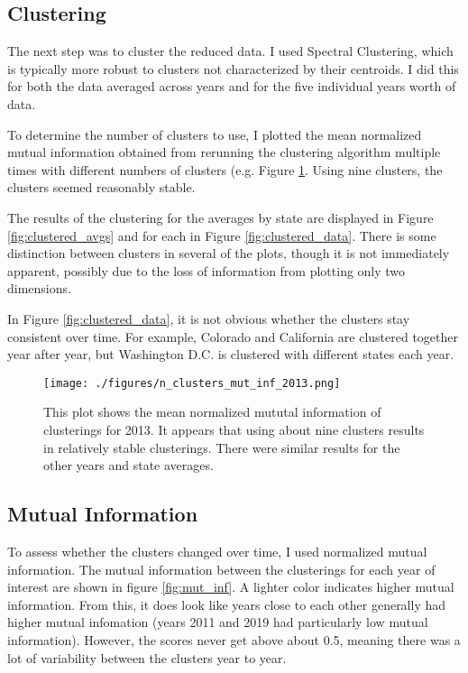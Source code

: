 \documentclass[11pt]{article}
\begin{document}
\subsection{Clustering}
The next step was to cluster the reduced data. I used Spectral Clustering, which is typically more robust to clusters not characterized by their centroids. I did this for both the data averaged across years and for the five individual years worth of data. 

To determine the number of clusters to use, I plotted the mean normalized mutual information obtained from rerunning the clustering algorithm multiple times with different numbers of clusters (e.g. Figure \ref{fig:n_clusters}. Using nine clusters, the clusters seemed reasonably stable. 

The results of the clustering for the averages by state are displayed in Figure \ref{fig:clustered_avgs} and for each in Figure \ref{fig:clustered_data}. There is some distinction between clusters in several of the plots, though it is not immediately apparent, possibly due to the loss of information from plotting only two dimensions.

In Figure \ref{fig:clustered_data}, it is not obvious whether the clusters stay consistent over time. For example, Colorado and California are clustered together year after year, but Washington D.C. is clustered with different states each year. 

\begin{figure}[hp]
\texttt{[image: ./figures/n\_clusters\_mut\_inf\_2013.png]}
\caption{
  This plot shows the mean normalized mututal information of clusterings for 2013. It appears that using about nine clusters results in relatively stable clusterings. There were similar results for the other years and state averages. 
}
\label{fig:n_clusters}
\end{figure}

\subsection{Mutual Information}
To assess whether the clusters changed over time, I used normalized mutual information. The mutual information between the clusterings for each year of interest are shown in figure \ref{fig:mut_inf}. A lighter color indicates higher mutual information. From this, it does look like years close to each other generally had higher mutual infomation (years 2011 and 2019 had particularly low mutual information). However, the scores never get above about 0.5, meaning there was a lot of variability between the clusters year to year. 
\end{document}
